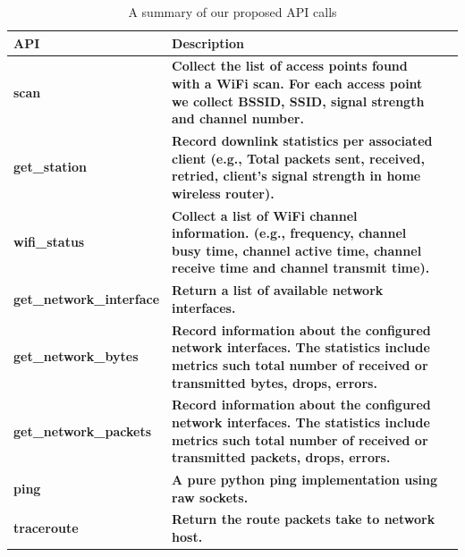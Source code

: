\begin{table}
\scriptsize
\centering
\begin{tabular}{|p{}| p{}| m{}|}
\hline
\textbf{API}    &  \textbf{Description} \\
 \hline
 {\bf scan} & {\bf Collect the list of access points found with a WiFi scan. For each access point we collect BSSID, SSID, signal strength and channel number.} \\
\hline
 {\bf get\_station} & {\bf Record downlink statistics per associated client (e.g., Total packets sent, received, retried, client's signal strength in home wireless router).} \\
\hline
 {\bf wifi\_status} & {\bf Collect a list of WiFi channel information. (e.g., frequency, channel busy time, channel active time, channel receive time and channel transmit time).} \\
\hline
 {\bf get\_network\_interface} & {\bf Return a list of available network interfaces.} \\
\hline
 {\bf get\_network\_bytes} & {\bf Record information about the configured network interfaces. The statistics include metrics such total number of received or transmitted bytes, drops, errors.} \\
\hline
 {\bf get\_network\_packets} & {\bf Record information about the configured network interfaces. The statistics include metrics such total number of received or transmitted packets, drops, errors.} \\
\hline
 {\bf ping} & {\bf A pure python ping implementation using raw sockets.} \\
\hline
 {\bf traceroute} & {\bf Return the route packets take to network host. } \\
\hline
\end{tabular}
\caption {A summary of our proposed API calls}
\label{table:new_api}
\end{table}

